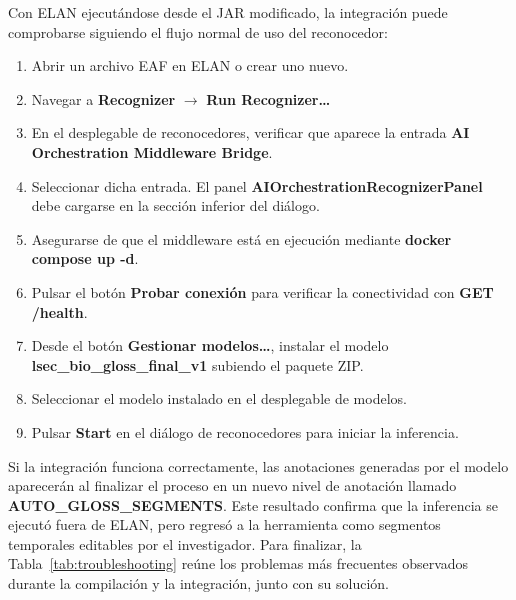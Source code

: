 Con ELAN ejecutándose desde el JAR modificado, la integración puede comprobarse siguiendo el flujo normal de uso del reconocedor:

\begin{enumerate}[noitemsep, topsep=2pt, parsep=0pt, partopsep=0pt]
    \item Abrir un archivo EAF en ELAN o crear uno nuevo.
    \item Navegar a \textbf{Recognizer} $\rightarrow$ \textbf{Run Recognizer\ldots}
    \item En el desplegable de reconocedores, verificar que aparece la entrada \textbf{AI Orchestration Middleware Bridge}.
    \item Seleccionar dicha entrada. El panel \textbf{AIOrchestrationRecognizerPanel} debe cargarse en la sección inferior del diálogo.
    \item Asegurarse de que el middleware está en ejecución mediante \textbf{docker compose up -d}.
    \item Pulsar el botón \textbf{Probar conexión} para verificar la conectividad con \textbf{GET /health}.
    \item Desde el botón \textbf{Gestionar modelos\ldots}, instalar el modelo \textbf{lsec\_bio\_gloss\_final\_v1} subiendo el paquete ZIP.
    \item Seleccionar el modelo instalado en el desplegable de modelos.
    \item Pulsar \textbf{Start} en el diálogo de reconocedores para iniciar la inferencia.
\end{enumerate}

Si la integración funciona correctamente, las anotaciones generadas por el modelo aparecerán al finalizar el proceso en un nuevo nivel de anotación llamado \textbf{AUTO\_GLOSS\_SEGMENTS}. Este resultado confirma que la inferencia se ejecutó fuera de ELAN, pero regresó a la herramienta como segmentos temporales editables por el investigador. Para finalizar, la Tabla~\ref{tab:troubleshooting} reúne los problemas más frecuentes observados durante la compilación y la integración, junto con su solución.

